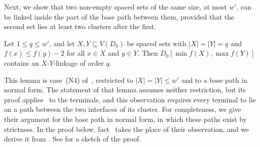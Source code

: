 \documentclass[fontsize=12pt,leading=14pt]{fullpaper}
\begin{document}
Next, we show that two non-empty spaced sets of the same size, at most $w'$, can be linked inside the part of the base path between them, provided that the second set lies at least two clusters after the first.

\begin{lemma}\label{lem:spaced-routing}
  Let $1\le q\le w'$, and let $X,Y\subseteq V(D_0)$ be spaced sets with $|X|=|Y|=q$ and $f(x)\le f(y)-2$ for all $x\in X$ and $y\in Y$.
  Then $D_0[\min f(X),\max f(Y)]$ contains an $X$-$Y$-linkage of order $q$.
\end{lemma}

This lemma is case~(N4) of~\cite[Lemma~8.8]{HKMM26a}, restricted to $|X|=|Y|\le w'$ and to a base path in normal form.
The statement of that lemma assumes neither restriction, but its proof applies~\cite[Observation~8.7]{HKMM26a} to the terminals, and this observation requires every terminal to lie on a path between the two interfaces of its cluster.
For completeness, we give their argument for the base path in normal form, in which these paths exist by strictness.
In the proof below, fact~ takes the place of their observation, and we derive it from .
See  for a sketch of the proof.
\end{document}
